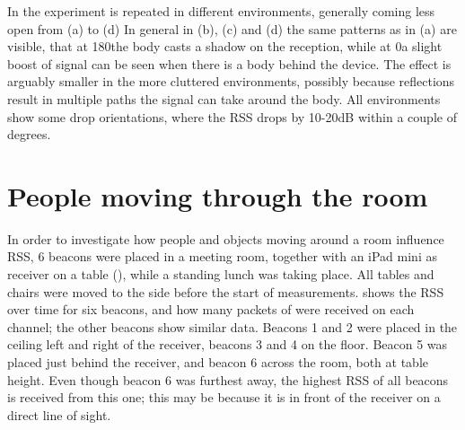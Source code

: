 In  the experiment is repeated in different environments, generally coming less open from (a) to (d)
In general in (b), (c) and (d) the same patterns as in (a) are visible, that at 180\tdegree the body casts a shadow on the reception, while at 0\tdegree a slight boost of signal can be seen when there is a body behind the device.
The effect is arguably smaller in the more cluttered environments, possibly because reflections result in multiple paths the signal can take around the body.
All environments show some drop orientations, where the RSS drops by 10-20dB within a couple of degrees.

\section{People moving through the room}
\label{sec:rss-busyroom}

In order to investigate how people and objects moving around a room influence RSS, 6 beacons were placed in a meeting room, together with an iPad mini as receiver on a table (), while a standing lunch was taking place.
All tables and chairs were moved to the side before the start of measurements.
 shows the RSS over time for six beacons, and how many packets of were received on each channel; the other beacons show similar data.
Beacons 1 and 2 were placed in the ceiling left and right of the receiver, beacons 3 and 4 on the floor.
Beacon 5 was placed just behind the receiver, and beacon 6 across the room, both at table height.
Even though beacon 6 was furthest away, the highest RSS of all beacons is received from this one; this may be because it is in front of the receiver on a direct line of sight.

